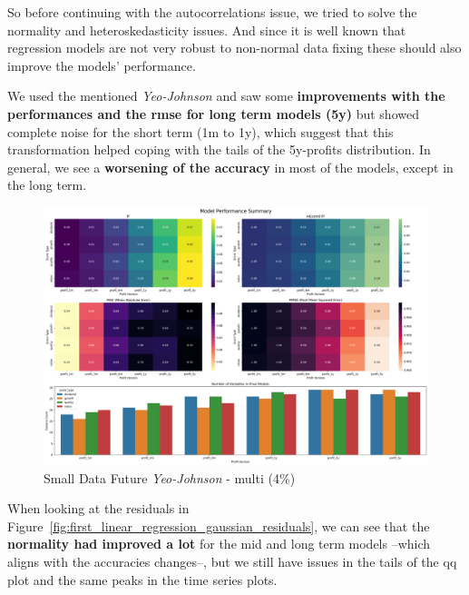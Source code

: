 \documentclass[11pt,english,a4paper,hidelinks]{book}
\begin{document}
\noindent So before continuing with the autocorrelations issue, we tried to solve the normality and heteroskedasticity issues. And since it is well known that regression models are not very robust to non-normal data fixing these should also improve the models' performance. 

\vspace{0.5cm}
\noindent We used the mentioned \textit{Yeo-Johnson} and saw some \textbf{improvements with the performances and the \acrshort{rmse} for long term models (5y)} but showed complete noise for the short term (1m to 1y), which suggest that this transformation helped coping with the tails of the 5y-profits distribution. In general, we see a \textbf{worsening of the accuracy} in most of the models, except in the long term.

\begin{figure}[H]
    \centering
    \includegraphics[width=1\textwidth]{images/code/models/linear_regression/first_model/Small Data future - Multi Gaussian performance.png}
    \caption{Small Data Future \textit{Yeo-Johnson} - \acrshort{multi} (4\%)}
    \label{fig:first_linear_regression_gaussian}
\end{figure}

\noindent When looking at the residuals in Figure~\ref{fig:first_linear_regression_gaussian_residuals}, we can see that the \textbf{normality had improved a lot} for the mid and long term models --which aligns with the accuracies changes--, but we still have issues in the tails of the \acrshort{qq} plot and the same peaks in the time series plots.
\end{document}
